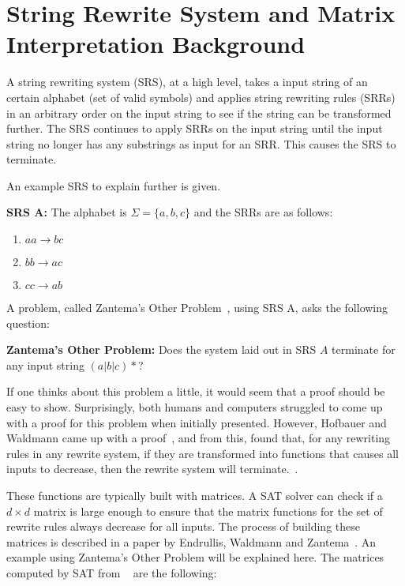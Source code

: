 \section{String Rewrite System and Matrix Interpretation Background}
A string rewriting system (SRS), at a high level, takes a input string of an certain alphabet (set of valid symbols) and applies string rewriting rules (SRRs) in an arbitrary order on the input string to see if the string can be transformed further. The SRS continues to apply SRRs on the input string until the input string no longer has any substrings as input for an SRR. This causes the SRS to terminate. \par
An example SRS to explain further is given.\par\noindent
\textbf{SRS A:} The alphabet is $\Sigma = \{a, b, c\}$ and the SRRs are as follows:
\begin{enumerate}
    \item $aa \rightarrow bc$
    \item $bb \rightarrow ac$
    \item $cc \rightarrow ab$
\end{enumerate}
A problem, called Zantema's Other Problem~\cite{Hofbauer:2006:TA:1142725.1711178}, using SRS A, asks the following question:\par\noindent
\textbf{Zantema's Other Problem:}
Does the system laid out in SRS $A$ terminate for any input string $(a|b|c)*$?\par
If one thinks about this problem a little, it would seem that a proof should be easy to show.  Surprisingly, both humans and computers struggled to come up with a proof for this problem when initially presented.  However, Hofbauer and Waldmann came up with a proof~\cite{Hofbauer:2006:TA:1142725.1711178}, and from this, found that, for any rewriting rules in any rewrite system, if they are transformed into functions that causes all inputs to decrease, then the rewrite system will terminate.~\cite{Hofbauer2006}. \par
These functions are typically built with matrices. A SAT solver can check if a $d \times d$ matrix is large enough to ensure that the matrix functions for the set of rewrite rules always decrease for all inputs. The process of building these matrices is described in a paper by Endrullis, Waldmann and Zantema~\cite{Endrullis2006}. An example using Zantema's Other Problem will be explained here. The matrices computed by SAT from ~\cite{Hofbauer:2006:TA:1142725.1711178} are the following:
